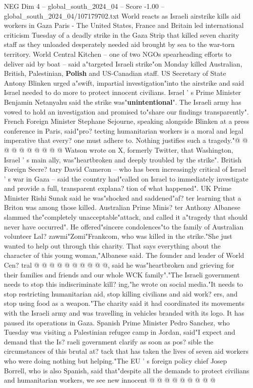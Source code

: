 \begin{textsample}{NEG Dim 4 – global\_south\_2024\_04 – Score -1.00 – global\_south\_2024\_04/107179702.txt}  \label{ex:f4_neg_194}
World reacts as Israeli airstrike kills aid workers in Gaza Paris - The United States, France and Britain led international criticism Tuesday of a deadly strike in the Gaza Strip that killed seven charity staff as they unloaded desperately needed aid brought by sea to the war-torn territory.
World Central Kitchen -- one of two NGOs spearheading efforts to deliver aid by boat -- said a"targeted Israeli strike"on Monday killed Australian, British, Palestinian, \textbf{Polish} and US-Canadian staff.
US Secretary of State Antony Blinken urged a"swift, impartial investigation"into the airstrike and said Israel needed to do more to protect innocent civilians.
Israel ' s Prime Minister Benjamin Netanyahu said the strike was"\textbf{unintentional}".
The Israeli army has vowed to hold an investigation and promised to"share our findings transparently".
French Foreign Minister Stephane Sejourne, speaking alongside Blinken at a press conference in Paris, said"pro? tecting humanitarian workers is a moral and legal imperative that every? one must adhere to.
Nothing justifies such a tragedy."@ @ @ @ @ @ @ @ @ @ Watson wrote on X, formerly Twitter, that Washington, Israel ' s main ally, was"heartbroken and deeply troubled by the strike".
British Foreign Secre? tary David Cameron -- who has been increasingly critical of Israel ' s war in Gaza -- said the country had"called on Israel to immediately investigate and provide a full, transparent explana? tion of what happened".
UK Prime Minister Rishi Sunak said he was"shocked and saddened"af? ter learning that a Briton was among those killed.
Australian Prime Minis? ter Anthony Albanese slammed the"completely unacceptable"attack, and called it a"tragedy that should never have occurred".
He offered"sincere condolences"to the family of Australian volunteer Lal? zawmi"Zomi"Frankcom, who was killed in the strike."She just wanted to help out through this charity.
That says everything about the character of this young woman,"Albanese said.
The founder and leader of World Cen? tral @ @ @ @ @ @ @ @ @ @, said he was"heartbroken and grieving for their families and friends and our whole WCK family"."The Israeli government needs to stop this indiscriminate kill? ing,"he wrote on social media."It needs to stop restricting humanitarian aid, stop killing civilians and aid work? ers, and stop using food as a weapon."The charity said it had coordinated its movements with the Israeli army and was travelling in vehicles branded with its logo.
It has paused its operations in Gaza.
Spanish Prime Minister Pedro Sanchez, who Tuesday was visiting a Palestinian refugee camp in Jordan, said"I expect and demand that the Is? raeli government clarify as soon as pos? sible the circumstances of this brutal at? tack that has taken the lives of seven aid workers who were doing nothing but helping."The EU ' s foreign policy chief Josep Borrell, who is also Spanish, said that"despite all the demands to protect civilians and humanitarian workers, we see new innocent @ @ @ @ @ @ @ @ @

\end{textsample}
